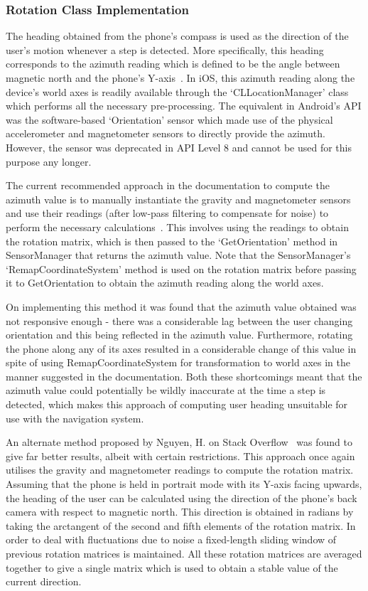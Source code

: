 \documentclass[12pt,a4paper]{report}
\begin{document}
        \subsubsection{Rotation Class Implementation}
            The heading obtained from the phone's compass is used as the direction of the user's motion whenever a step is detected. More specifically, this heading corresponds to the azimuth reading which is defined to be the angle between magnetic north and the phone's Y-axis~\cite{azimuthDefinition}. In iOS, this azimuth reading along the device's world axes is readily available through the `CLLocationManager' class which performs all the necessary pre-processing. The equivalent in Android's API was the software-based `Orientation' sensor which made use of the physical accelerometer and magnetometer sensors to directly provide the azimuth. However, the sensor was deprecated in API Level 8 and cannot be used for this purpose any longer. 

The current recommended approach in the documentation to compute the azimuth value is to manually instantiate the gravity and magnetometer sensors and use their readings (after low-pass filtering to compensate for noise) to perform the necessary calculations~\cite{ENU}. This involves using the readings to obtain the rotation matrix, which is then passed to the `GetOrientation' method in SensorManager that returns the azimuth value. Note that the SensorManager's `RemapCoordinateSystem' method is used on the rotation matrix before passing it to GetOrientation to obtain the azimuth reading along the world axes.  

On implementing this method it was found that the azimuth value obtained was not responsive enough - there was a considerable lag between the user changing orientation and this being reflected in the azimuth value. Furthermore, rotating the phone along any of its axes resulted in a considerable change of this value in spite of using RemapCoordinateSystem for transformation to world axes in the manner suggested in the documentation. Both these shortcomings meant that the azimuth value could potentially be wildly inaccurate at the time a step is detected, which makes this approach of computing user heading unsuitable for use with the navigation system. 

An alternate method proposed by Nguyen, H. on Stack Overflow~\cite{azimuthFinal} was found to give far better results, albeit with certain restrictions. This approach once again utilises the gravity and magnetometer readings to compute the rotation matrix. Assuming that the phone is held in portrait mode with its Y-axis facing upwards, the heading of the user can be calculated using the direction of the phone's back camera with respect to magnetic north. This direction is obtained in radians by taking the arctangent of the second and fifth elements of the rotation matrix. In order to deal with fluctuations due to noise a fixed-length sliding window of previous rotation matrices is maintained. All these rotation matrices are averaged together to give a single matrix which is used to obtain a stable value of the current direction.
\end{document}
